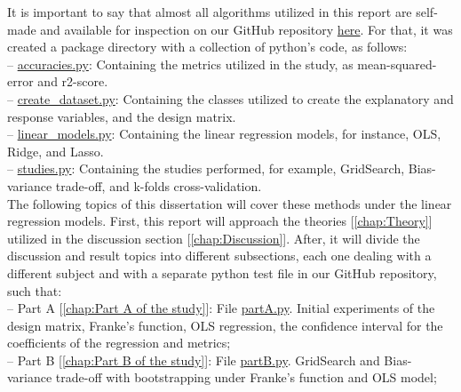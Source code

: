 It is important to say that almost all algorithms utilized in this report are self-made and available for inspection on our GitHub repository \href{https://github.com/fabiorodp/UiO-FYS-STK4155/blob/master/Project1/}{here}. For that, it was created a package directory with a collection of python's code, as follows:\\

-- \href{https://github.com/fabiorodp/UiO-FYS-STK4155/blob/master/Project1/package/accuracies.py}{accuracies.py}: Containing the metrics utilized in the study, as mean-squared-error and r2-score.\\

-- \href{https://github.com/fabiorodp/UiO-FYS-STK4155/blob/master/Project1/package/create_dataset.py}{create\_dataset.py}: Containing the classes utilized to create the explanatory and response variables, and the design matrix.\\

-- \href{https://github.com/fabiorodp/UiO-FYS-STK4155/blob/master/Project1/package/linear_models.py}{linear\_models.py}: Containing the linear regression models, for instance, OLS, Ridge, and Lasso.\\

-- \href{https://github.com/fabiorodp/UiO-FYS-STK4155/blob/master/Project1/package/studies.py}{studies.py}: Containing the studies performed, for example, GridSearch, Bias-variance trade-off, and k-folds cross-validation.\\

The following topics of this dissertation will cover these methods under the linear regression models. First, this report will approach the theories [\ref{chap:Theory}] utilized in the discussion section [\ref{chap:Discussion}]. After, it will divide the discussion and result topics into different subsections, each one dealing with a different subject and with a separate python test file in our GitHub repository, such that:\\

-- Part A [\ref{chap:Part A of the study}]: File \href{https://github.com/fabiorodp/UiO-FYS-STK4155/blob/master/Project1/partA.py}{partA.py}. Initial experiments of the design matrix, Franke's function, OLS regression, the confidence interval for the coefficients of the regression and metrics;\\

-- Part B [\ref{chap:Part B of the study}]: File \href{https://github.com/fabiorodp/UiO-FYS-STK4155/blob/master/Project1/partB.py}{partB.py}. GridSearch and Bias-variance trade-off with bootstrapping under Franke's function and OLS model;\\

